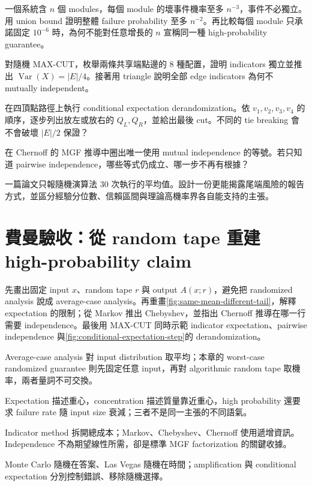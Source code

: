 \documentclass[11pt,a4paper,oneside,openany]{book}
\begin{document}
\begin{exercise}
一個系統含 $n$ 個 modules，每個 module 的壞事件機率至多 $n^{-3}$，事件不必獨立。用 union bound 證明整體 failure probability 至多 $n^{-2}$。再比較每個 module 只承諾固定 $10^{-6}$ 時，為何不能對任意增長的 $n$ 宣稱同一種 high-probability guarantee。
\end{exercise}
\begin{exercise}
\label{ex:maxcut-variance}
對隨機 MAX-CUT，枚舉兩條共享端點邊的 8 種配置，證明 indicators 獨立並推出 $\operatorname{Var}(X)=|E|/4$。接著用 triangle 說明全部 edge indicators 為何不 mutually independent。
\end{exercise}
\begin{exercise}
在四頂點路徑上執行 conditional expectation derandomization。依 $v_1,v_2,v_3,v_4$ 的順序，逐步列出放左或放右的 $Q_L,Q_R$，並給出最後 cut。不同的 tie breaking 會不會破壞 $|E|/2$ 保證？
\end{exercise}
\begin{exercise}
在 Chernoff 的 MGF 推導中圈出唯一使用 mutual independence 的等號。若只知道 pairwise independence，哪些等式仍成立、哪一步不再有根據？
\end{exercise}
\begin{exercise}
一篇論文只報隨機演算法 30 次執行的平均值。設計一份更能揭露尾端風險的報告方式，並區分經驗分位數、信賴區間與理論高機率界各自能支持的主張。
\end{exercise}

\section{費曼驗收：從 random tape 重建 high-probability claim}
\begin{feynmancheck}
先畫出固定 input $x$、random tape $r$ 與 output $A(x;r)$，避免把 randomized analysis 說成 average-case analysis。再重畫\cref{fig:same-mean-different-tail}，解釋 expectation 的限制；從 Markov 推出 Chebyshev，並指出 Chernoff 推導在哪一行需要 independence。最後用 MAX-CUT 同時示範 indicator expectation、pairwise independence 與\cref{fig:conditional-expectation-step}的 derandomization。
\end{feynmancheck}
\begin{chapterrecap}
\item Average-case analysis 對 input distribution 取平均；本章的 worst-case randomized guarantee 則先固定任意 input，再對 algorithmic random tape 取機率，兩者量詞不可交換。
\item Expectation 描述重心，concentration 描述質量靠近重心，high probability 還要求 failure rate 隨 input size 衰減；三者不是同一主張的不同語氣。
\item Indicator method 拆開總成本；Markov、Chebyshev、Chernoff 使用遞增資訊。Independence 不為期望線性所需，卻是標準 MGF factorization 的關鍵收據。
\item Monte Carlo 隨機在答案、Las Vegas 隨機在時間；amplification 與 conditional expectation 分別控制錯誤、移除隨機選擇。
\end{chapterrecap}
\end{document}
